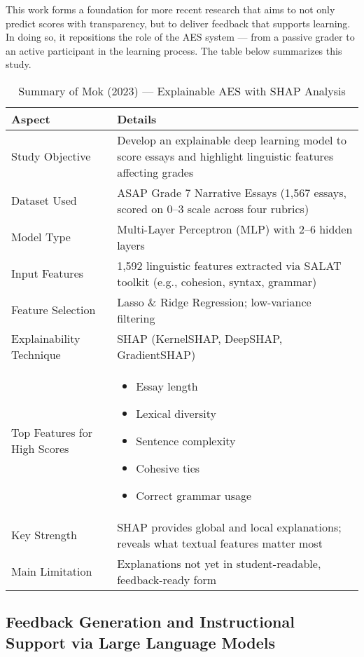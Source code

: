 \documentclass[a4paper,twoside,12pt]{report}
\begin{document}
This work forms a foundation for more recent research that aims to not only predict scores with transparency, but to deliver feedback that supports learning. In doing so, it repositions the role of the AES system — from a passive grader to an active participant in the learning process.
The table below summarizes this study.
\begin{table}[h!]
  \centering
  \begin{tabular}{|p{4.5cm}|p{10.5cm}|}
  \hline
  \textbf{Aspect} & \textbf{Details} \\
  \hline
  Study Objective & Develop an explainable deep learning model to score essays and highlight linguistic features affecting grades \\
  \hline
  Dataset Used & ASAP Grade 7 Narrative Essays (1,567 essays, scored on 0–3 scale across four rubrics) \\
  \hline
  Model Type & Multi-Layer Perceptron (MLP) with 2–6 hidden layers \\
  \hline
  Input Features & 1,592 linguistic features extracted via SALAT toolkit (e.g., cohesion, syntax, grammar) \\
  \hline
  Feature Selection & Lasso \& Ridge Regression; low-variance filtering \\
  \hline
  Explainability Technique & SHAP (KernelSHAP, DeepSHAP, GradientSHAP) \\
  \hline
  Top Features for High Scores & 
  \begin{itemize}
    \item Essay length
    \item Lexical diversity
    \item Sentence complexity
    \item Cohesive ties
    \item Correct grammar usage
  \end{itemize} \\
  \hline
  Key Strength & SHAP provides global and local explanations; reveals what textual features matter most \\
  \hline
  Main Limitation & Explanations not yet in student-readable, feedback-ready form \\
  \hline
  \end{tabular}
  \caption{Summary of Mok (2023) — Explainable AES with SHAP Analysis}
  \label{tab:mok2023_summary}
  \end{table}
  
  \subsection{Feedback Generation and Instructional Support via Large Language Models}
\end{document}
